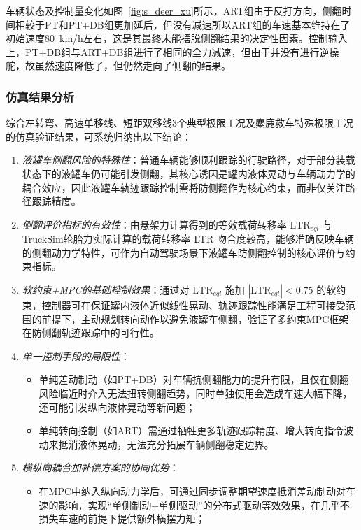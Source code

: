             车辆状态及控制量变化如图~\ref{fig:s_deer_xu}所示，ART组由于反打方向，侧翻时间相较于PT和PT+DB组更加延后，但没有减速所以ART组的车速基本维持在了初始速度\SI{80}{km/h}左右，这是其最终未能摆脱侧翻结果的决定性因素。控制输入上，PT+DB组与ART+DB组进行了相同的全力减速，但由于并没有进行逆操舵，故虽然速度降低了，但仍然走向了侧翻的结果。


    \subsubsection{仿真结果分析}        
    \label{subsub:simu_analysis}
        综合左转弯、高速单移线、短距双移线3个典型极限工况及麋鹿救车特殊极限工况的仿真验证结果，可系统归纳出以下结论：
        \begin{enumerate}
            \item \emph{液罐车侧翻风险的特殊性}：普通车辆能够顺利跟踪的行驶路径，对于部分装载状态下的液罐车仍可能引发侧翻，其核心诱因是罐内液体晃动与车辆动力学的耦合效应，因此液罐车轨迹跟踪控制需将防侧翻作为核心约束，而非仅关注路径跟踪精度。
            \item \emph{侧翻评价指标的有效性}：由悬架力计算得到的等效载荷转移率 $\text{LTR}_{eql}$ 与TruckSim轮胎力实际计算的载荷转移率 LTR 吻合度较高，能够准确反映车辆的侧翻动力学特性，可作为自动驾驶场景下液罐车防侧翻控制的核心评价与约束指标。
            \item \emph{软约束+MPC的基础控制效果}：通过对 $\text{LTR}_{eql}$ 施加 $|\text{LTR}_{eql}| < 0.75$ 的软约束，控制器可在保证罐内液体近似线性晃动、轨迹跟踪性能满足工程可接受范围的前提下，主动规划转向动作以避免液罐车侧翻，验证了多约束MPC框架在防侧翻轨迹跟踪中的可行性。
            \item \emph{单一控制手段的局限性}：
                \begin{itemize}
                    \item 单纯差动制动（如PT+DB）对车辆抗侧翻能力的提升有限，且仅在侧翻风险临近时介入无法扭转侧翻趋势，同时单独使用会造成车速大幅下降，还可能引发纵向液体晃动等新问题；
                    \item 单纯转向控制（如ART）需通过牺牲更多轨迹跟踪精度、增大转向指令波动来抵消液体晃动，无法充分拓展车辆侧翻稳定边界。
                \end{itemize}
            \item \emph{横纵向耦合加补偿方案的协同优势}：
                \begin{itemize}
                    \item 在MPC中纳入纵向动力学后，可通过同步调整期望速度抵消差动制动对车速的影响，实现“单侧制动+单侧驱动”的分布式驱动等效效果，在几乎不损失车速的前提下提供额外横摆力矩；

\end{itemize}
\end{enumerate}
